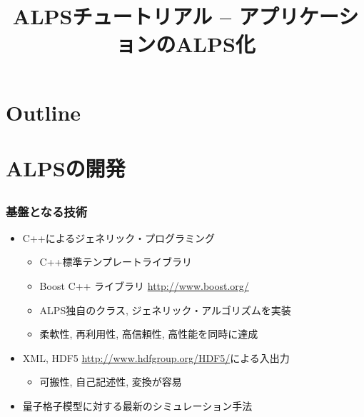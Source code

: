 \title{ALPSチュートリアル -- アプリケーションのALPS化}




\begin{frame}
  \titlepage
\end{frame}

\section*{Outline}
\begin{frame}
  \tableofcontents
\end{frame}

\section{ALPSの開発}

\subsection*{\redm\whitem\greenb}
\begin{frame}
  \frametitle{基盤となる技術}
  \begin{itemize}
    \setlength{\itemsep}{1em}
  \item C++によるジェネリック・プログラミング
    \begin{itemize}
    \item C++標準テンプレートライブラリ
    \item Boost C++ ライブラリ \url{http://www.boost.org/}
    \item ALPS独自のクラス, ジェネリック・アルゴリズムを実装
    \item 柔軟性, 再利用性, 高信頼性, 高性能を同時に達成
    \end{itemize}
  \item XML, HDF5 \url{http://www.hdfgroup.org/HDF5/}による入出力
    \begin{itemize}
    \item 可搬性, 自己記述性, 変換が容易
    \end{itemize}
  \item 量子格子模型に対する最新のシミュレーション手法
  \end{itemize}
\end{frame}

